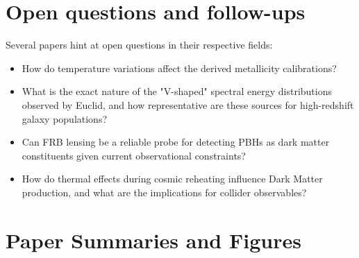 \documentclass[11pt]{article}
\begin{document}
\section*{Open questions and follow-ups}
Several papers hint at open questions in their respective fields:
\begin{itemize}
\item How do temperature variations affect the derived metallicity calibrations?
\item What is the exact nature of the "V-shaped" spectral energy distributions observed by Euclid, and how representative are these sources for high-redshift galaxy populations?
\item Can FRB lensing be a reliable probe for detecting PBHs as dark matter constituents given current observational constraints?
\item How do thermal effects during cosmic reheating influence Dark Matter production, and what are the implications for collider observables?
\end{itemize}
\newpage
\section*{Paper Summaries and Figures}
\end{document}
